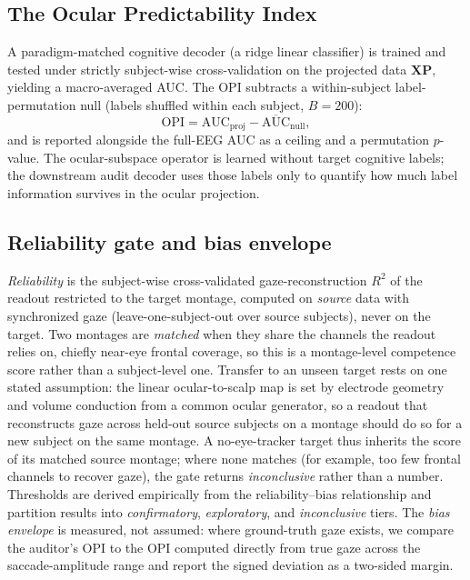\documentclass[conference]{IEEEtran}
\begin{document}
\subsection{The Ocular Predictability Index}

A paradigm-matched cognitive decoder (a ridge linear classifier) is trained and tested under
strictly subject-wise cross-validation on the projected data $\mathbf{X}\mathbf{P}$, yielding a
macro-averaged AUC. The OPI subtracts a within-subject label-permutation null (labels shuffled
within each subject, $B=200$):
\begin{equation}
\mathrm{OPI}=\mathrm{AUC}_{\mathrm{proj}}-\overline{\mathrm{AUC}}_{\mathrm{null}},
\end{equation}
and is reported alongside the full-EEG AUC as a ceiling and a permutation $p$-value. The
ocular-subspace operator is learned without target cognitive labels; the downstream audit
decoder uses those labels only to quantify how much label information survives in the ocular
projection.

\subsection{Reliability gate and bias envelope}

\emph{Reliability} is the subject-wise cross-validated gaze-reconstruction $R^2$ of the readout
restricted to the target montage, computed on \emph{source} data with synchronized gaze
(leave-one-subject-out over source subjects), never on the target. Two montages are
\emph{matched} when they share the channels the readout relies on, chiefly near-eye frontal
coverage, so this is a montage-level competence score rather than a subject-level one. Transfer
to an unseen target rests on one stated assumption: the linear ocular-to-scalp map is set by
electrode geometry and volume conduction from a common ocular generator, so a readout that
reconstructs gaze across held-out source subjects on a montage should do so for a new subject on
the same montage. A no-eye-tracker target thus inherits the score of its matched source montage;
where none matches (for example, too few frontal channels to recover gaze), the gate returns
\emph{inconclusive} rather than a number. Thresholds are derived empirically from the
reliability--bias relationship and partition results into \emph{confirmatory},
\emph{exploratory}, and \emph{inconclusive} tiers. The \emph{bias envelope} is measured, not
assumed: where ground-truth gaze exists, we compare the auditor's OPI to the OPI computed
directly from true gaze across the saccade-amplitude range and report the signed deviation as a
two-sided margin.
\end{document}
